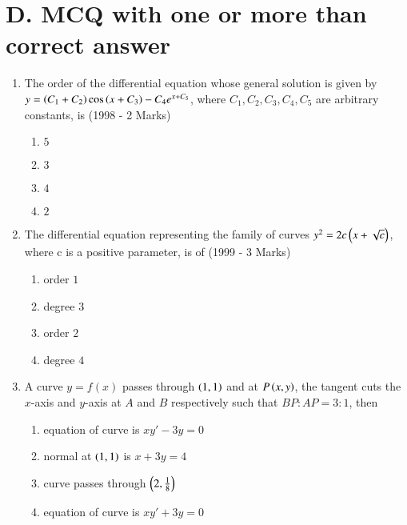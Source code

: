 \documentclass[journal,12pt,twocolumn]{IEEEtran}
\theoremstyle{remark}
\begin{document}
\section*{D. MCQ with one or more than correct answer}
\begin{enumerate}
    
\item The order of the differential equation whose general solution is given by
$y = \left(C_1 + C_2\right) \cos \left(x + C_3\right) - C_4 e^{x+C_5}$, where $C_1, C_2, C_3, C_4, C_5$ are arbitrary constants, is \hfill (1998 - 2 Marks)

\begin{multicols}{2}
\begin{enumerate}
    \item $5$
    \item $3$ 
    \item $4$
    \item $2$ 
\end{enumerate} 
\end{multicols}

\item  The differential equation representing the family of curves
$y^2 = 2c \left(x + \sqrt{c}\right)$, where c  is a positive parameter, is of \hfill(1999 - 3 Marks)

\begin{multicols}{2}
\begin{enumerate}
    \item order $1$ 
    \item degree $3$
    \item order $2$
    \item degree $4$
\end{enumerate}
\end{multicols}

\item  A curve $ y = f(x) $ passes through $ \left(1,1\right) $ and at $ P\left(x, y\right) $, the tangent cuts the $ x $-axis and $ y $-axis at $ A $ and $ B $ respectively such that $ BP : AP = 3 : 1 $, then
\begin{enumerate}[label=(\alph*)]
    \item equation of curve is $ xy' - 3y = 0 $
    \item normal at $ \left(1, 1\right) $ is $ x + 3y = 4 $
    \item curve passes through $ \left(2, \frac{1}{8}\right) $
    \item equation of curve is $xy' + 3y = 0 $
\end{enumerate}


\end{enumerate}
\end{document}
